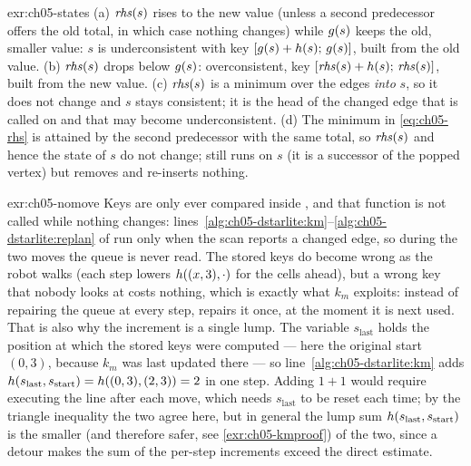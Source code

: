 
\begin{solution}{exr:ch05-states}
(a) $\mathit{rhs}(s)$ rises to the new value (unless a second predecessor offers the old total, in which case nothing changes) while $g(s)$ keeps the old, smaller value: $s$ is underconsistent with key $[g(s)+h(s);\,g(s)]$, built from the old value. (b) $\mathit{rhs}(s)$ drops below $g(s)$: overconsistent, key $[\mathit{rhs}(s)+h(s);\,\mathit{rhs}(s)]$, built from the new value. (c) $\mathit{rhs}(s)$ is a minimum over the edges \emph{into} $s$, so it does not change and $s$ stays consistent; it is the head of the changed edge that \LpaUpdateVertex is called on and that may become underconsistent. (d) The minimum in \cref{eq:ch05-rhs} is attained by the second predecessor with the same total, so $\mathit{rhs}(s)$ and hence the state of $s$ do not change; \LpaUpdateVertex still runs on $s$ (it is a successor of the popped vertex) but removes and re-inserts nothing.
\end{solution}

\begin{solution}{exr:ch05-nomove}
Keys are only ever compared inside \DslComputeShortestPath, and that function is not called while nothing changes: lines~\ref{alg:ch05-dstarlite:km}--\ref{alg:ch05-dstarlite:replan} of \DslMain run only when the scan reports a changed edge, so during the two moves the queue is never read. The stored keys do become wrong as the robot walks (each step lowers $h((x,3),\cdot)$ for the cells ahead), but a wrong key that nobody looks at costs nothing, which is exactly what $k_m$ exploits: instead of repairing the queue at every step, \dstarlite repairs it once, at the moment it is next used. That is also why the increment is a single lump. The variable $s_{\mathrm{last}}$ holds the position at which the stored keys were computed --- here the original start $(0,3)$, because $k_m$ was last updated there --- so line~\ref{alg:ch05-dstarlite:km} adds $h(s_{\mathrm{last}},s_{\mathrm{start}})=h((0,3),(2,3))=2$ in one step. Adding $1+1$ would require executing the line after each move, which needs $s_{\mathrm{last}}$ to be reset each time; by the triangle inequality the two agree here, but in general the lump sum $h(s_{\mathrm{last}},s_{\mathrm{start}})$ is the smaller (and therefore safer, see \cref{exr:ch05-kmproof}) of the two, since a detour makes the sum of the per-step increments exceed the direct estimate.
\end{solution}

